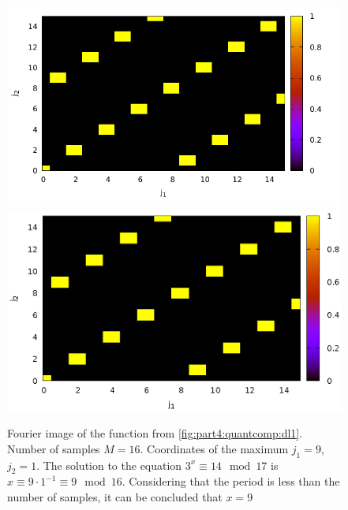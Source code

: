 \begin{figure}
\centering

\ifpdf
\includegraphics[angle=0]
{./part4/quantcomp/picdiscretlog2.pdf}
\else
\includegraphics[angle=0]
{./part4/quantcomp/picdiscretlog2.eps}
\fi

%

\caption{Fourier image of the function from \autoref{fig:part4:quantcomp:dl1}.
  Number of samples $M=16$. Coordinates of the maximum $j_1 = 9$, $j_2 = 1$. 
The solution to the equation $3^x \equiv 14 \mod 17$
is $x \equiv 9 \cdot 1^{-1} \equiv 9 \mod 16$. Considering that
the period is less than the number of samples, it can be concluded that $x = 9$} 
\label{fig:part4:quantcomp:dl2}
\end{figure}